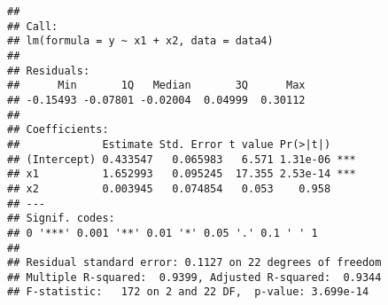 \documentclass[
]{article}
\begin{document}
\begin{verbatim}
## 
## Call:
## lm(formula = y ~ x1 + x2, data = data4)
## 
## Residuals:
##      Min       1Q   Median       3Q      Max 
## -0.15493 -0.07801 -0.02004  0.04999  0.30112 
## 
## Coefficients:
##             Estimate Std. Error t value Pr(>|t|)    
## (Intercept) 0.433547   0.065983   6.571 1.31e-06 ***
## x1          1.652993   0.095245  17.355 2.53e-14 ***
## x2          0.003945   0.074854   0.053    0.958    
## ---
## Signif. codes:  
## 0 '***' 0.001 '**' 0.01 '*' 0.05 '.' 0.1 ' ' 1
## 
## Residual standard error: 0.1127 on 22 degrees of freedom
## Multiple R-squared:  0.9399, Adjusted R-squared:  0.9344 
## F-statistic:   172 on 2 and 22 DF,  p-value: 3.699e-14
\end{verbatim}
\end{document}

